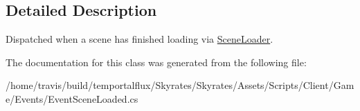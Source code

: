 \subsection{Detailed Description}
Dispatched when a scene has finished loading via \hyperlink{class_scene_loader}{Scene\-Loader}. 



The documentation for this class was generated from the following file\-:\begin{DoxyCompactItemize}
\item 
/home/travis/build/temportalflux/\-Skyrates/\-Skyrates/\-Assets/\-Scripts/\-Client/\-Game/\-Events/Event\-Scene\-Loaded.\-cs\end{DoxyCompactItemize}
